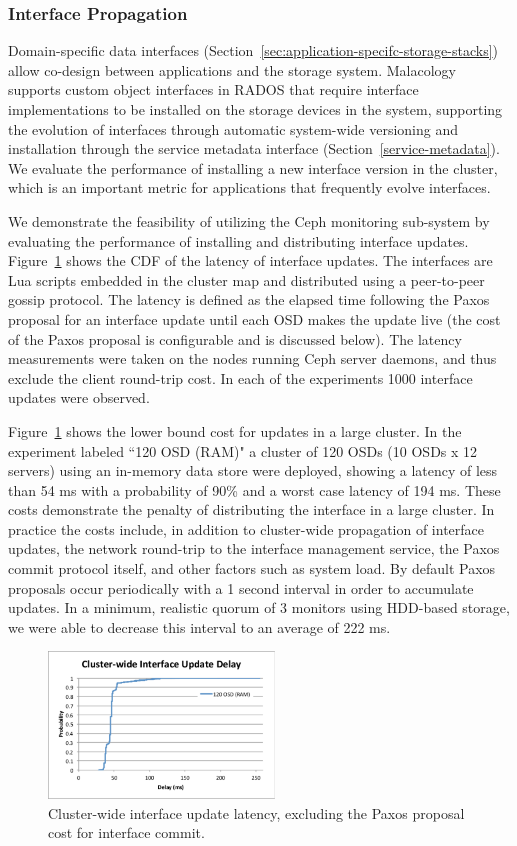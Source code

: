 \documentclass[preprint]{sigplanconf-eurosys}
\begin{document}
\subsubsection{Interface Propagation}

Domain-specific data interfaces (Section~\ref{sec:application-specifc-storage-stacks}) allow
co-design between applications and the storage system. Malacology supports
custom object interfaces in RADOS that require interface implementations to
be installed on the storage devices in the system, supporting the evolution of
interfaces through automatic system-wide versioning and installation through
the service metadata interface (Section~\ref{service-metadata}). We evaluate
the performance of installing a new interface version in the cluster,
which is an important metric for applications that frequently evolve
interfaces.

We demonstrate the feasibility of utilizing the Ceph monitoring sub-system by
evaluating the performance of installing and distributing interface updates.
Figure~\ref{fig:propdelay} shows the CDF of the latency of interface updates.
The interfaces are Lua scripts embedded in the cluster map and distributed
using a peer-to-peer gossip protocol.  The latency is defined as the elapsed
time following the Paxos proposal for an interface update until each OSD makes
the update live (the cost of the Paxos proposal is configurable and is
discussed below). The latency measurements were taken on the nodes running
Ceph server daemons, and thus exclude the client round-trip cost. In each of
the experiments 1000 interface updates were observed.

Figure~\ref{fig:propdelay} shows the lower bound cost for updates in a large
cluster. In the experiment labeled ``120 OSD (RAM)" a cluster of 120 OSDs (10
OSDs x 12 servers) using an in-memory data store were deployed, showing a
latency of less than 54 ms with a probability of 90\% and a worst case latency
of 194 ms. These costs demonstrate the penalty of distributing the interface
in a large cluster. In practice the costs include, in addition to cluster-wide
propagation of interface updates, the network round-trip to the
interface management service, the Paxos commit protocol itself, and other factors
such as system load. By default Paxos proposals occur periodically with a 1
second interval in order to accumulate updates. In a minimum, realistic quorum
of 3 monitors using HDD-based storage, we were able to decrease this interval
to an average of 222 ms.

\begin{figure}[tbp]
\centering
\includegraphics[width=60mm,trim={1 4 4 1.3cm},clip]{figures/iface-update-delay.pdf}
\caption{Cluster-wide interface update latency, excluding the Paxos proposal cost for
interface commit.}
\label{fig:propdelay}
\end{figure}
\end{document}
